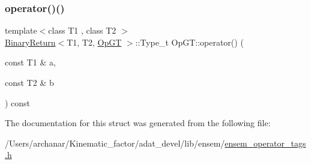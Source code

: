 \mbox{\label{structOpGT_a8571b221a0c893055b34bdfbd8922fd4}} 
\subsubsection{\texorpdfstring{operator()()}{operator()()}\hspace{0.1cm}{\footnotesize\ttfamily [2/2]}}
{\footnotesize\ttfamily template$<$class T1 , class T2 $>$ \\
\mbox{\hyperlink{structBinaryReturn}{Binary\+Return}}$<$T1, T2, \mbox{\hyperlink{structOpGT}{Op\+GT}} $>$\+::Type\+\_\+t Op\+G\+T\+::operator() (\begin{DoxyParamCaption}\item[{const T1 \&}]{a,  }\item[{const T2 \&}]{b }\end{DoxyParamCaption}) const\hspace{0.3cm}{\ttfamily [inline]}}



The documentation for this struct was generated from the following file\+:\begin{DoxyCompactItemize}
\item 
/\+Users/archanar/\+Kinematic\+\_\+factor/adat\+\_\+devel/lib/ensem/\mbox{\hyperlink{lib_2ensem_2ensem__operator__tags_8h}{ensem\+\_\+operator\+\_\+tags.\+h}}\end{DoxyCompactItemize}

